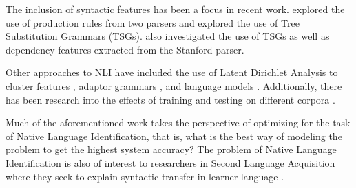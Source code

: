 \documentclass[11pt,letterpaper]{article}
\begin{document}
The inclusion of syntactic features has been a focus in recent work.
  explored the use of production rules
from two parsers and  explored
the use of Tree Substitution Grammars (TSGs).   also investigated the use of TSGs as well as dependency
features extracted from the Stanford parser.

Other approaches to NLI have included the use of Latent Dirichlet Analysis
to cluster features \cite{Sze-MengJojoWongMarkDrasMarkJohnson:2011:ALTA2011},
adaptor grammars \cite{wong-dras-johnson:2012:EMNLP-CoNLL}, and
language models \cite{tetreault-EtAl:2012:PAPERS}.  Additionally, there has
been research into the effects of training and testing on different
corpora \cite{brooke2011native}.


Much of the aforementioned work takes the perspective of optimizing for the
task of Native Language Identification, that is, what is the best way of
modeling the problem to get the highest system accuracy?  The problem
of Native Language Identification is also of interest to researchers in
Second Language Acquisition where they seek to explain syntactic transfer
in learner language \cite{jarvis2012approaching}.
\end{document}
